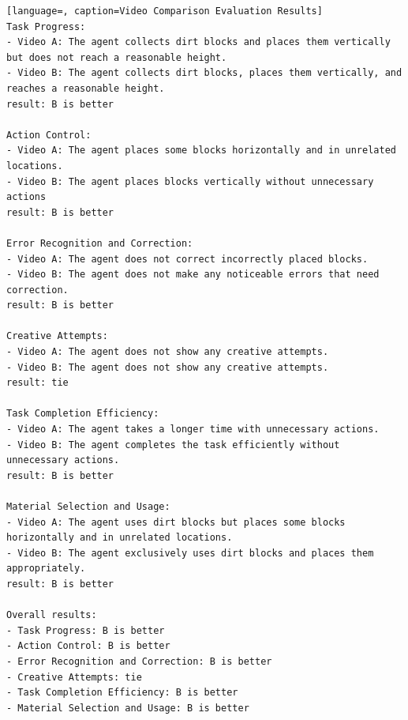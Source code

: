 \begin{lstlisting}[language=, caption=Video Comparison Evaluation Results]
Task Progress:
- Video A: The agent collects dirt blocks and places them vertically but does not reach a reasonable height.
- Video B: The agent collects dirt blocks, places them vertically, and reaches a reasonable height.
result: B is better

Action Control:
- Video A: The agent places some blocks horizontally and in unrelated locations.
- Video B: The agent places blocks vertically without unnecessary actions
result: B is better

Error Recognition and Correction:
- Video A: The agent does not correct incorrectly placed blocks.
- Video B: The agent does not make any noticeable errors that need correction.
result: B is better

Creative Attempts:
- Video A: The agent does not show any creative attempts.
- Video B: The agent does not show any creative attempts.
result: tie

Task Completion Efficiency:
- Video A: The agent takes a longer time with unnecessary actions.
- Video B: The agent completes the task efficiently without unnecessary actions.
result: B is better

Material Selection and Usage:
- Video A: The agent uses dirt blocks but places some blocks horizontally and in unrelated locations.
- Video B: The agent exclusively uses dirt blocks and places them appropriately.
result: B is better

Overall results:
- Task Progress: B is better
- Action Control: B is better
- Error Recognition and Correction: B is better
- Creative Attempts: tie
- Task Completion Efficiency: B is better
- Material Selection and Usage: B is better
\end{lstlisting}


\newpage

